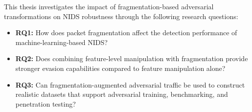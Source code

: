 This thesis investigates the impact of fragmentation-based adversarial transformations on NIDS
robustness through the following research questions:

\begin{itemize}
    \item \textbf{RQ1:} How does packet fragmentation affect the detection performance of machine-learning-based NIDS?
    \item \textbf{RQ2:} Does combining feature-level manipulation with fragmentation provide stronger evasion capabilities compared to feature manipulation alone?
    \item \textbf{RQ3:} Can fragmentation-augmented adversarial traffic be used to construct realistic datasets that support adversarial training, benchmarking, and penetration testing?
\end{itemize}



